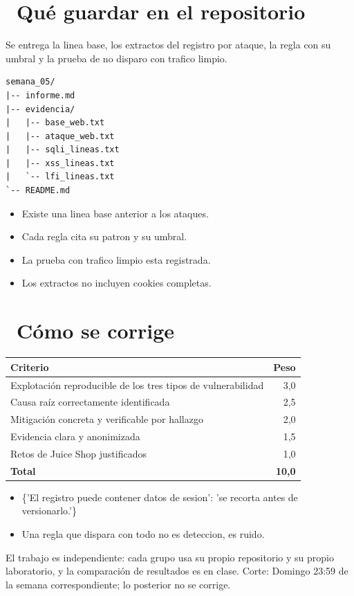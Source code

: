 \documentclass[11pt,a4paper]{article}
\newcommand{\iconotexto}[2]{\textcolor{cyanNeon}{\faIcon{#1}}~#2}
\begin{document}
\section{\iconotexto{box-open}{Qué guardar en el repositorio}}

Se entrega la linea base, los extractos del registro por ataque, la regla con su umbral y la prueba de no disparo con trafico limpio.

\begin{lstlisting}[style=estiloCodigo]
semana_05/
|-- informe.md
|-- evidencia/
|   |-- base_web.txt
|   |-- ataque_web.txt
|   |-- sqli_lineas.txt
|   |-- xss_lineas.txt
|   `-- lfi_lineas.txt
`-- README.md
\end{lstlisting}

\begin{itemize}[leftmargin=1.4em,itemsep=2pt,topsep=3pt]
  \item Existe una linea base anterior a los ataques.
  \item Cada regla cita su patron y su umbral.
  \item La prueba con trafico limpio esta registrada.
  \item Los extractos no incluyen cookies completas.
\end{itemize}

\section{\iconotexto{ruler-combined}{Cómo se corrige}}

\begin{tabularx}{\linewidth}{@{}X r@{}}
\toprule
Criterio & Peso\\
\midrule
Explotación reproducible de los tres tipos de vulnerabilidad & 3,0 \\
Causa raíz correctamente identificada & 2,5 \\
Mitigación concreta y verificable por hallazgo & 2,0 \\
Evidencia clara y anonimizada & 1,5 \\
Retos de Juice Shop justificados & 1,0 \\
\midrule
\textbf{Total} & \textbf{10,0}\\
\bottomrule
\end{tabularx}

\begin{itemize}[leftmargin=1.4em,itemsep=2pt,topsep=3pt]
  \item \{'El registro puede contener datos de sesion': 'se recorta antes de versionarlo.'\}
  \item Una regla que dispara con todo no es deteccion, es ruido.
\end{itemize}

\begin{cajaRecuerda}El trabajo es independiente: cada grupo usa su propio repositorio y su propio laboratorio, y la comparación de resultados es en clase. Corte: Domingo 23:59 de la semana correspondiente; lo posterior no se corrige.
\end{cajaRecuerda}
\end{document}
